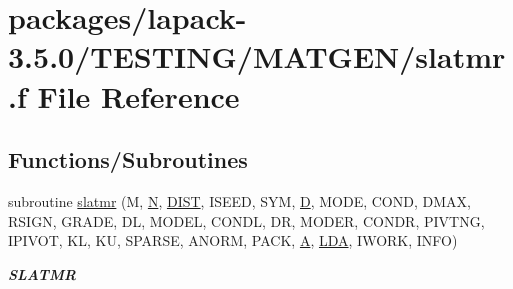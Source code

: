 \hypertarget{slatmr_8f}{}\section{packages/lapack-\/3.5.0/\+T\+E\+S\+T\+I\+N\+G/\+M\+A\+T\+G\+E\+N/slatmr.f File Reference}
\label{slatmr_8f}
\subsection*{Functions/\+Subroutines}
\begin{DoxyCompactItemize}
\item 
subroutine \hyperlink{group__real__matgen_gab8833c811131e57b4132c9735ba80693}{slatmr} (M, \hyperlink{polmisc_8c_a0240ac851181b84ac374872dc5434ee4}{N}, \hyperlink{superlu__enum__consts_8h_af00a42ecad444bbda75cde1b64bd7e72ac04fbbdf0d80a4ad25e565541deeebd7}{D\+I\+S\+T}, I\+S\+E\+E\+D, S\+Y\+M, \hyperlink{odrpack_8h_a7dae6ea403d00f3687f24a874e67d139}{D}, M\+O\+D\+E, C\+O\+N\+D, D\+M\+A\+X, R\+S\+I\+G\+N, G\+R\+A\+D\+E, D\+L, M\+O\+D\+E\+L, C\+O\+N\+D\+L, D\+R, M\+O\+D\+E\+R, C\+O\+N\+D\+R, P\+I\+V\+T\+N\+G, I\+P\+I\+V\+O\+T, K\+L, K\+U, S\+P\+A\+R\+S\+E, A\+N\+O\+R\+M, P\+A\+C\+K, \hyperlink{classA}{A}, \hyperlink{example__user_8c_ae946da542ce0db94dced19b2ecefd1aa}{L\+D\+A}, I\+W\+O\+R\+K, I\+N\+F\+O)
\begin{DoxyCompactList}\small\item\em {\bfseries S\+L\+A\+T\+M\+R} \end{DoxyCompactList}\end{DoxyCompactItemize}

